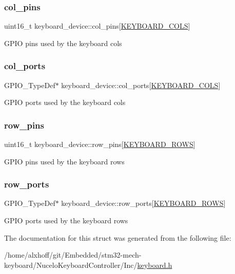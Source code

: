 \subsubsection{\texorpdfstring{col\+\_\+pins}{col\_pins}}
{\footnotesize\ttfamily uint16\+\_\+t keyboard\+\_\+device\+::col\+\_\+pins\mbox{[}\hyperlink{keymap_8h_ada65ea6a2010790e481acf033b2f8351}{K\+E\+Y\+B\+O\+A\+R\+D\+\_\+\+C\+O\+LS}\mbox{]}}

G\+P\+IO pins used by the keyboard cols \mbox{\label{structkeyboard__device_ac896175bb4e598e4e62671f2525d93b5}} 
\subsubsection{\texorpdfstring{col\+\_\+ports}{col\_ports}}
{\footnotesize\ttfamily G\+P\+I\+O\+\_\+\+Type\+Def$\ast$ keyboard\+\_\+device\+::col\+\_\+ports\mbox{[}\hyperlink{keymap_8h_ada65ea6a2010790e481acf033b2f8351}{K\+E\+Y\+B\+O\+A\+R\+D\+\_\+\+C\+O\+LS}\mbox{]}}

G\+P\+IO ports used by the keyboard cols \mbox{\label{structkeyboard__device_afb61cd72f0bdd515150a10e46e9ecfc3}} 
\subsubsection{\texorpdfstring{row\+\_\+pins}{row\_pins}}
{\footnotesize\ttfamily uint16\+\_\+t keyboard\+\_\+device\+::row\+\_\+pins\mbox{[}\hyperlink{keymap_8h_ab89c69b09d4ca01020b7c40d9ca2bab8}{K\+E\+Y\+B\+O\+A\+R\+D\+\_\+\+R\+O\+WS}\mbox{]}}

G\+P\+IO pins used by the keyboard rows \mbox{\label{structkeyboard__device_a3538201c09ca68013a086626a63ca362}} 
\subsubsection{\texorpdfstring{row\+\_\+ports}{row\_ports}}
{\footnotesize\ttfamily G\+P\+I\+O\+\_\+\+Type\+Def$\ast$ keyboard\+\_\+device\+::row\+\_\+ports\mbox{[}\hyperlink{keymap_8h_ab89c69b09d4ca01020b7c40d9ca2bab8}{K\+E\+Y\+B\+O\+A\+R\+D\+\_\+\+R\+O\+WS}\mbox{]}}

G\+P\+IO ports used by the keyboard rows 

The documentation for this struct was generated from the following file\+:\begin{DoxyCompactItemize}
\item 
/home/alxhoff/git/\+Embedded/stm32-\/mech-\/keyboard/\+Nucelo\+Keyboard\+Controller/\+Inc/\hyperlink{keyboard_8h}{keyboard.\+h}\end{DoxyCompactItemize}
